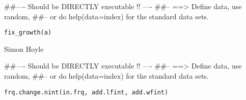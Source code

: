 \documentclass[a4paper]{book}
\begin{document}
%
\begin{Examples}
\begin{ExampleCode}
##---- Should be DIRECTLY executable !! ----
##-- ==>  Define data, use random,
##--	or do  help(data=index)  for the standard data sets.

\end{ExampleCode}
\end{Examples}
%
\begin{Usage}
\begin{verbatim}
fix_growth(a)
\end{verbatim}
\end{Usage}
%
\begin{Arguments}
\begin{ldescription}
\item[\code{a}] 


\end{ldescription}
\end{Arguments}
%
\begin{Author}\relax

Simon Hoyle
\end{Author}
%
\begin{Examples}
\begin{ExampleCode}
##---- Should be DIRECTLY executable !! ----
##-- ==>  Define data, use random,
##--	or do  help(data=index)  for the standard data sets.

\end{ExampleCode}
\end{Examples}
%
\begin{Usage}
\begin{verbatim}
frq.change.nint(in.frq, add.lfint, add.wfint)
\end{verbatim}
\end{Usage}
%
\begin{Arguments}
\begin{ldescription}
\item[\code{in.frq}] 


\item[\code{add.lfint}] 


\item[\code{add.wfint}] 


\end{ldescription}
\end{Arguments}
\end{document}

